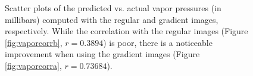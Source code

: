 \begin{figure}
	\centering
	\caption[Scatter plots of the predicted vs. actual vapor pressures (in millibars) computed with the regular and gradient images]{Scatter plots of the predicted vs. actual vapor pressures (in millibars) computed with the regular and gradient images, respectively. While the correlation with the regular images (Figure \ref{fig:vaporcorrb}, $r=0.3894$) is poor, there is a noticeable improvement when using the gradient images (Figure \ref{fig:vaporcorra}, $r=0.73684$).}
	\label{fig:vaporcorr}
\end{figure}

